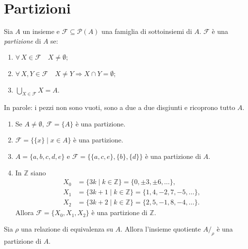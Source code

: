 \documentclass[11pt,a4paper]{article}
\begin{document}
\section{Partizioni}

\begin{definizione}
Sia $A$ un insieme e $\mathcal{F} \subseteq \mathcal{P}(A)$ una famiglia di
sottoinsiemi di $A$. $\mathcal{F}$ è una \emph{partizione} di $A$ se:
\begin{enumerate}
    \item $\forall\, X \in \mathcal{F} \quad X \neq \emptyset$;
    \item $\forall\, X, Y \in \mathcal{F} \quad X \neq Y \Rightarrow
          X \cap Y = \emptyset$;
    \item $\displaystyle \bigcup_{X \in \mathcal{F}} X = A$.
\end{enumerate}
\end{definizione}

In parole: i pezzi non sono vuoti, sono a due a due disgiunti e ricoprono
tutto $A$.

\begin{esempio}
\leavevmode
\begin{enumerate}
    \item Se $A \neq \emptyset$, $\mathcal{F} = \{A\}$ è una partizione.
    \item $\mathcal{F} = \{\{x\} \mid x \in A\}$ è una partizione.
    \item $A = \{a, b, c, d, e\}$ e
          $\mathcal{F} = \{\{a, c, e\}, \{b\}, \{d\}\}$ è una partizione
          di $A$.
    \item In $\mathbb{Z}$ siano
          \begin{align*}
          X_0 &= \{3k \mid k \in \mathbb{Z}\} = \{0, \pm 3, \pm 6, \dots\},\\
          X_1 &= \{3k + 1 \mid k \in \mathbb{Z}\}
                = \{1, 4, -2, 7, -5, \dots\},\\
          X_2 &= \{3k + 2 \mid k \in \mathbb{Z}\}
                = \{2, 5, -1, 8, -4, \dots\}.
          \end{align*}
          Allora $\mathcal{F} = \{X_0, X_1, X_2\}$ è una partizione di
          $\mathbb{Z}$.
\end{enumerate}
\end{esempio}

\begin{proposizione}[A]
Sia $\rho$ una relazione di equivalenza su $A$. Allora l'insieme quotiente
$A/_\rho$ è una partizione di $A$.
\end{proposizione}
\end{document}
